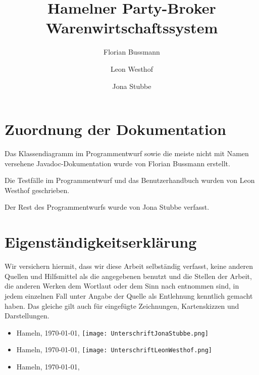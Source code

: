 \documentclass[a4paper,12pt,titlepage]{article}
\title{Hamelner Party-Broker Warenwirtschaftssystem}
\author{Florian Bussmann \and Leon Westhof \and Jona Stubbe}
\begin{document}
\part{Zuordnung der Dokumentation}
Das Klassendiagramm im Programmentwurf sowie die meiste nicht mit Namen versehene Javadoc-Dokumentation wurde von Florian Bussmann erstellt.

Die Testfälle im Programmentwurf und das Benutzerhandbuch wurden von Leon Westhof geschrieben.

Der Rest des Programmentwurfs wurde von Jona Stubbe verfasst.


\part{Eigenständigkeitserklärung}
Wir versichern hiermit, dass wir diese Arbeit selbständig verfasst, keine anderen Quellen und Hilfsmittel
als die angegebenen benutzt und die Stellen der Arbeit, die anderen Werken dem Wortlaut oder dem Sinn nach entnommen sind,
in jedem einzelnen Fall unter Angabe der Quelle als Entlehnung kenntlich gemacht haben.
Das gleiche gilt auch für eingefügte Zeichnungen, Kartenskizzen und Darstellungen.
\begin{itemize}
\item Hameln, \today, \texttt{[image: UnterschriftJonaStubbe.png]}
\item Hameln, \today, \texttt{[image: UnterschriftLeonWesthof.png]}
\item Hameln, \today, 
\end{itemize}
\end{document}
